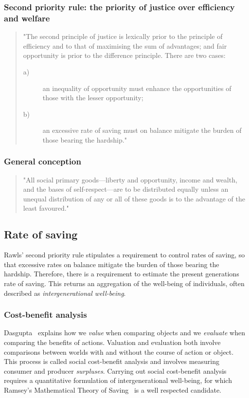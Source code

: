 \documentclass[11pt, oneside]{article}   	%
\begin{document}
\subsubsection{Second priority rule: the priority of justice over efficiency and welfare}

\begin{quote}
"The second principle of justice is lexically prior to the principle of efficiency and to that of maximising the sum of advantages; and fair opportunity is prior to the difference principle. There are two cases:
\begin{description}
\item[ a)] an inequality of opportunity must enhance the opportunities of those with the lesser opportunity;
\item[ b)] an excessive rate of saving must on balance mitigate the burden of those bearing the hardship."
\end{description}
\end{quote}

\subsubsection{General conception}

\begin{quote}
"All social primary goods---liberty and opportunity, income and wealth, and the bases of self-respect---are to be distributed equally unless an unequal distribution of any or all of these goods is to the advantage of the least favoured."
\end{quote}

\subsection{Rate of saving}

Rawls' second priority rule stipulates a requirement to control rates of saving, so that excessive rates on balance mitigate the burden of those bearing the hardship. Therefore, there is a requirement to estimate the present generations rate of saving. This returns an aggregation of the well-being of individuals, often described as \emph{intergenerational well-being}.

\subsubsection{Cost-benefit analysis}

Dasgupta~\cite{pd2} explains how we \emph{value} when comparing objects and we \emph{evaluate} when comparing the benefits of actions.
Valuation and evaluation both involve comparisons between worlds with and without the course of action or object.
This process is called social cost-benefit analysis and involves measuring consumer and producer \emph{surpluses}.
Carrying out social cost-benefit analysis requires a quantitative formulation of intergenerational well-being, for which Ramsey's Mathematical Theory of Saving~\cite{fr1} is a well respected candidate.
\end{document}

